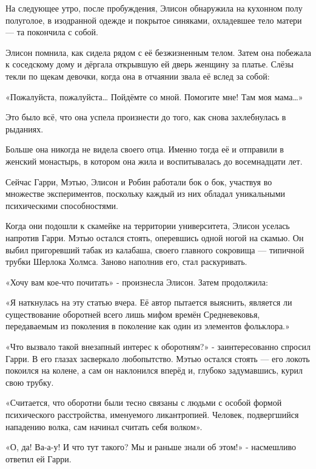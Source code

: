 \documentclass[a4paper,12pt]{book}
\begin{document}
\par
На следующее утро, после пробуждения, Элисон обнаружила на кухонном полу полуголое, в изодранной одежде и покрытое синяками, охладевшее тело матери — та покончила с собой.
\par
Элисон помнила, как сидела рядом с её безжизненным телом. Затем она побежала к соседскому дому и дёргала открывшую ей дверь женщину за платье. Слёзы текли по щекам девочки, когда она в отчаянии звала её вслед за собой:
\par
«Пожалуйста, пожалуйста… Пойдёмте со мной. Помогите мне! Там моя мама…»
\par
Это было всё, что она успела произнести до того, как снова захлебнулась в рыданиях.
\par
Больше она никогда не видела своего отца. Именно тогда её и отправили в женский монастырь, в котором она жила и воспитывалась до восемнадцати лет.\\
\par
Сейчас Гарри, Мэтью, Элисон и Робин работали бок о бок, участвуя во множестве экспериментов, поскольку каждый из них обладал уникальными психическими способностями.\\
\par
Когда они подошли к скамейке на территории университета, Элисон уселась напротив Гарри. Мэтью остался стоять, оперевшись одной ногой на скамью. Он выбил пригоревший табак из калабаша, своего главного сокровища — типичной трубки Шерлока Холмса. Заново наполнив его, стал раскуривать.\\
\par
«Хочу вам кое-что почитать» - произнесла Элисон. Затем продолжила:
\par
«Я наткнулась на эту статью вчера. Её автор пытается выяснить, является ли существование оборотней всего лишь мифом времён Средневековья, передаваемым из поколения в поколение как один из элементов фольклора.»\\
\par
«Что вызвало такой внезапный интерес к оборотням?» - заинтересованно спросил Гарри. В его глазах засверкало любопытство. Мэтью остался стоять — его локоть покоился на колене, а сам он наклонился вперёд и, глубоко задумавшись, курил свою трубку.
\par
«Считается, что оборотни были тесно связаны с людьми с особой формой психического расстройства, именуемого ликантропией. Человек, подвергшийся нападению волка, сам начинал считать себя волком».
\par
«О, да! Ва-а-у! И что тут такого? Мы и раньше знали об этом!» - насмешливо ответил ей Гарри.
\end{document}
